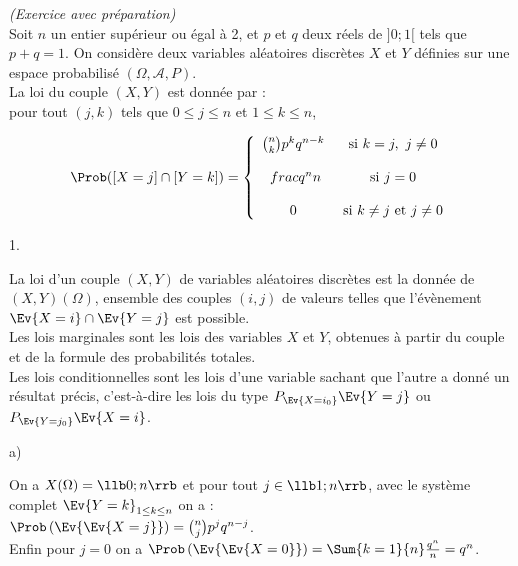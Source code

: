 \documentclass[11pt]{article}%
\begin{document}

 \newpage

 \begin{exercice}{\it (Exercice avec préparation)}~\\
 Soit $n$ un entier supérieur ou égal à 2, et $p$ et $q$ deux réels de
$]0;1[$ tels que $p + q = 1$. On considère deux variables aléatoires
discrètes $X$ et $Y$ définies sur une espace probabilisé $(\Omega,
\mathcal{A}, P)$. \\
 La loi du couple $(X, Y)$ est donnée par : \\
 pour tout $(j,k)$ tels que $0 \leq j \leq n$ et $1 \leq k \leq n$,
 
\[
 \Prob( [X = j] \cap [Y = k] ) = \left\{ 
\begin{array}{cc}
 \binom{n}{k} p^{k} q^{n-k} & \text{ si } k = j,\ j \neq 0 \\
\\\
frac{q^{n}}{n} & \text{ si } j = 0 \\
\\0 & \text{ si } k \neq j \text{ et } j \neq 0 \\
\end{array}
\right.
\]
 \begin{noliste}{1.}
 \setlength{\itemsep}{4mm}
 \item La loi d'un couple $(X,Y)$ de variables aléatoires discrètes est
la donnée de $(X,Y) (\Omega)$, ensemble des couples $(i,j)$ de valeurs
telles que l'évènement $\Ev{X = i} \cap \Ev{Y = j}$ est possible. \\
 Les lois marginales sont les lois des variables $X$ et $Y$, obtenues à
partir du couple et de la formule des probabilités totales. \\
 Les lois conditionnelles sont les lois d'une variable sachant que
l'autre a donné un résultat précis, c'est-à-dire les lois du type
$P_{\Ev{X = i_{0}}} \Ev{Y = j}$ ou $P_{\Ev{Y = j_{0}}} \Ev{X = i}$. \\
 \item 
 \begin{noliste}{a)}
 \setlength{\itemsep}{2mm} 
 \item On a $X(\Omega) = \llb 0 ; n \rrb$ et pour tout $j \in \llb 1 ;
n \rrb$, avec le système complet $\Ev{Y = k}_{1 \leq k \leq n}$ on a :
\\
 $\Prob\left(\Ev{\Ev{X = j}}\right) = \binom{n}{j} p^{j} q^{n-j}$. \\
 Enfin pour $j = 0$ on a $\Prob\left(\Ev{\Ev{X = 0}}\right) = \Sum{k =
1}{n} \frac{q^{n}}{n} = q^{n}$. \\

\end{noliste}
\end{noliste}
\end{exercice}
\end{document}
